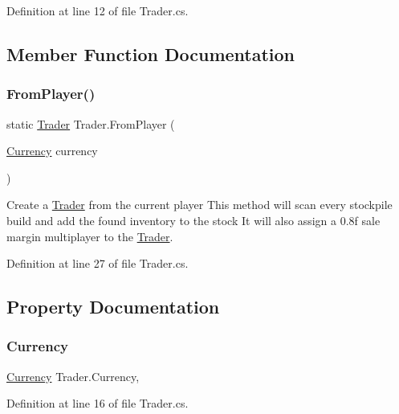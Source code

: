 Definition at line 12 of file Trader.\+cs.



\subsection{Member Function Documentation}
\mbox{\label{class_trader_a20568768abb24b6706dea5bb8981fda7}} 
\subsubsection{\texorpdfstring{From\+Player()}{FromPlayer()}}
{\footnotesize\ttfamily static \hyperlink{class_trader}{Trader} Trader.\+From\+Player (\begin{DoxyParamCaption}\item[{\hyperlink{class_currency}{Currency}}]{currency }\end{DoxyParamCaption})\hspace{0.3cm}{\ttfamily [static]}}



Create a \hyperlink{class_trader}{Trader} from the current player This method will scan every stockpile build and add the found inventory to the stock It will also assign a 0.\+8f sale margin multiplayer to the \hyperlink{class_trader}{Trader}. 



Definition at line 27 of file Trader.\+cs.



\subsection{Property Documentation}
\mbox{\label{class_trader_a9f4dec66f691ba5654ea352efa5af78b}} 
\subsubsection{\texorpdfstring{Currency}{Currency}}
{\footnotesize\ttfamily \hyperlink{class_currency}{Currency} Trader.\+Currency\hspace{0.3cm}{\ttfamily [get]}, {\ttfamily [set]}}



Definition at line 16 of file Trader.\+cs.

